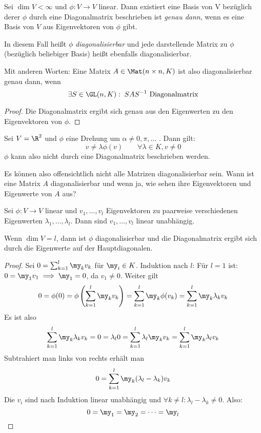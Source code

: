 \documentclass[a4paper, 10pt]{scrbook}
\begin{document}
\begin{prop}
\label{prop:10.2}
Sei $\dim V < \infty$ und $\phi:V\to V$ linear.
Dann existiert eine Basis von V bezüglich derer $\phi$ durch eine Diagonalmatrix beschrieben ist
\emph{genau dann}, wenn es eine Basis von $V$ aus Eigenvektoren von $\phi$ gibt.

In diesem Fall heißt $\phi$ \emph{diagonalisierbar} und jede darstellende Matrix zu $\phi$ (bezüglich beliebiger Basis)
heißt ebenfalls diagonalisierbar.

Mit anderen Worten:
Eine Matrix $A\in\Mat(n\times n, K)$ ist also diagonalisierbar genau dann, wenn
\[
\exists S\in \GL(n,K):\; SAS^{-1} \text{ Diagonalmatrix}
\]
\begin{proof}
Die Diagonalmatrix ergibt sich genau aus den Eigenwerten zu den Eigenvektoren von $\phi$.
\end{proof}
\end{prop}

Sei $V=\R^2$ und $\phi$ eine Drehung um $\alpha\neq 0,\pi,\dotsc$ .
Dann gilt:
\[
v\neq \lambda\phi(v) \qquad \forall\lambda\in K,v\neq 0
\]
$\phi$ kann also nicht durch eine Diagonalmatrix beschrieben werden.

Es können also offensichtlich nicht alle Matrizen diagonalisierbar sein.
Wann ist eine Matrix $A$ diagonalisierbar und wenn ja, wie sehen ihre Eigenvektoren und Eigenwerte von $A$ aus?

\begin{prop}
\label{prop:10.3}
Sei $\phi:V\to V$ linear und $v_1,\dotsc,v_l$ Eigenvektoren zu paarweise verschiedenen Eigenwerten $\lambda_1,\dotsc,\lambda_l$.
Dann sind $v_1,\dotsc,v_l$ linear unabhängig.

Wenn $\dim V=l$, dann ist $\phi$ diagonalisierbar und die Diagonalmatrix ergibt sich durch die Eigenwerte auf der Hauptdiagonalen.
\begin{proof}

Sei $0=\sum_{k=1}^l\my_kv_k$ für $\my_i\in K$.
Induktion nach $l$:
Für $l=1$ ist: $0=\my_1v_1 \implies \my_1=0$, da $v_1\neq 0$.
Weiter gilt
\[
0=\phi(0)=\phi\left(\sum_{k=1}^l\my_kv_k\right)=\sum_{k=1}^l\my_k\phi(v_k)=\sum_{k=1}^l\my_k\lambda_kv_k
\]
Es ist also
\[
	\sum_{k=1}^l\my_k\lambda_kv_k = 0 = \lambda_l 0= \sum_{k=1}^l\lambda_l\my_kv_k = \sum_{k=1}^l\my_k\lambda_{l}v_k
\]
Subtrahiert man links von rechts erhält man
\[
	0= \sum_{k=1}^{l}\my_k(\lambda_{l}-\lambda_k)v_k 
\]
Die $v_i$ sind nach Induktion linear unabhängig und $\forall k\neq l:\lambda_{l}-\lambda_k \neq 0$.
Also:
\[
0=\my_1=\my_2=\dotsb=\my_{l}
\]
\end{proof}
\end{prop}
\end{document}
